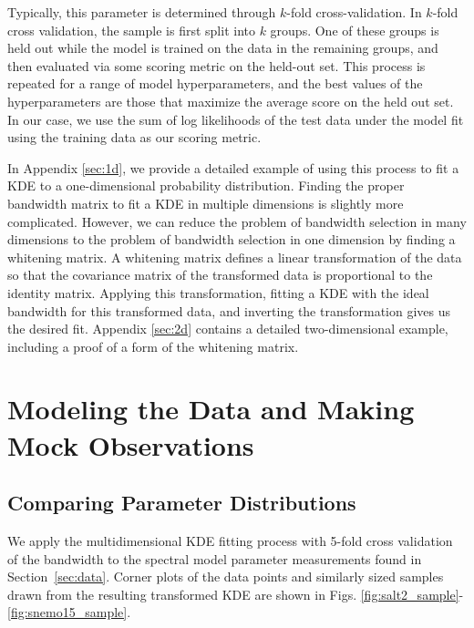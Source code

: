 Typically, this parameter is determined through $k$-fold cross-validation. In $k$-fold cross validation, the sample is first split into $k$ groups. One of these groups is held out while the model is trained on the data in the remaining groups, and then evaluated via some scoring metric on the held-out set. This process is repeated for a range of model hyperparameters, and the best values of the hyperparameters are those that maximize the average score on the held out set. In our case, we use the sum of log likelihoods of the test data under the model fit using the training data as our scoring metric.

In Appendix \ref{sec:1d}, we provide a detailed example of using this process to fit a KDE to a one-dimensional probability distribution. Finding the proper bandwidth matrix to fit a KDE in multiple dimensions is slightly more complicated. However, we can reduce the problem of bandwidth selection in many dimensions to the problem of bandwidth selection in one dimension by finding a whitening matrix. A whitening matrix defines a linear transformation of the data so that the covariance matrix of the transformed data is proportional to the identity matrix. Applying this transformation, fitting a KDE with the ideal bandwidth for this transformed data, and inverting the transformation gives us the desired fit. Appendix \ref{sec:2d} contains a detailed two-dimensional example, including a proof of a form of the whitening matrix.

\section{Modeling the Data and Making Mock Observations}
\label{sec:making_mocks}
\subsection{Comparing Parameter Distributions}
We apply the multidimensional KDE fitting process with 5-fold cross validation of the bandwidth to the spectral model parameter measurements found in Section~\ref{sec:data}. Corner plots of the data points and similarly sized samples drawn from the resulting transformed KDE are shown in Figs. \ref{fig:salt2_sample}-\ref{fig:snemo15_sample}.

